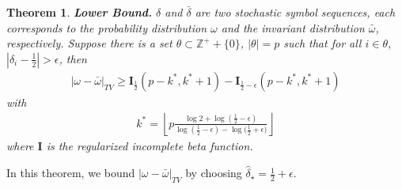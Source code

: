 \documentclass[dvips,landscape]{foils}
\renewcommand{\oursection}[1]{
\foilhead[-1.0cm]{#1}
}
\newtheorem{theorem}{Theorem}
\DeclareMathOperator{\erf}{erf}
\begin{document}
\begin{theorem}\textbf{Lower Bound.}
\label{theoremlb}
$\delta$ and $\bar{\delta}$ are two stochastic symbol sequences, each corresponds to the probability distribution $\omega$ and the invariant distribution $\bar{\omega}$, respectively. Suppose there is a set $\theta \subset \mathbb{Z}^++\{0\} $, $|\theta|=p$ such that for all $i \in \theta$, $|\delta_i-\frac{1}{2}|>\epsilon$, then
\begin{eqnarray}
\label{lbineq}
|\omega-\bar{\omega}|_{TV} \ge \mathbf{I}_{\frac{1}{2}}(p-k^*,k^*+1) - \mathbf{I}_{\frac{1}{2}-\epsilon}(p-k^*,k^*+1)
\end{eqnarray}
with
\begin{eqnarray}
\label{kstar}
k^* =  \left\lfloor p \frac{\log{2}+\log{(\frac{1}{2}-\epsilon)} }{\log{(\frac{1}{2}-\epsilon)}-\log{(\frac{1}{2}+\epsilon})} \right\rfloor
\end{eqnarray}
where $\mathbf{I}$ is the regularized incomplete beta function.
\end{theorem}
In this theorem, we bound $|\omega-\bar{\omega}|_{TV}$ by choosing $\hat{\delta}_\star = \frac{1}{2}+\epsilon$. 
\end{document}
